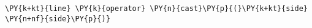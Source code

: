 \begin{Verbatim}[commandchars=\\\{\}]
    \PY{k+kt}{line} \PY{k}{operator} \PY{n}{cast}\PY{p}{(}\PY{k+kt}{side} \PY{n+nf}{side}\PY{p}{)}
\end{Verbatim}

